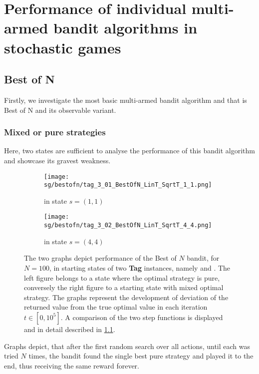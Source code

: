 \documentclass[../main.tex]{subfiles}
\begin{document}
\chapter{Performance of individual multi-armed bandit algorithms in stochastic games}\label{apx:sgexp}

\section{Best of N}\label{apx:sgexp:bestofn}
Firstly, we investigate the most basic multi-armed bandit algorithm and that is Best of N and its observable variant.

\subsection{Mixed or pure strategies}
Here, two states are sufficient to analyse the performance of this bandit algorithm and showcase its gravest weakness.

\begin{figure}[ht]
    \begin{subfigure}[t]{0.45\linewidth}
        \texttt{[image: sg/bestofn/tag\_3\_01\_BestOfN\_LinT\_SqrtT\_1\_1.png]}
        \caption{ in state $s = \left(1, 1\right)$}
        \label{apx:sgexp:bestofn:fig:pure}
    \end{subfigure}
    \hfill
    \begin{subfigure}[t]{0.45\linewidth}
        \texttt{[image: sg/bestofn/tag\_3\_02\_BestOfN\_LinT\_SqrtT\_4\_4.png]}
        \caption{ in state $s = \left(4, 4\right)$}
        \label{apx:sgexp:bestofn:fig:mixed}
    \end{subfigure}
    \caption[Performance of the Best of $N$ bandit on instances of \textbf{Tag}]{
        The two graphs depict performance of the Best of $N$ bandit, for $N = 100$, in starting states of two \textbf{Tag} instances, namely  and .
        The left figure belongs to a state where the optimal strategy is pure, conversely the right figure to a starting state with mixed optimal strategy.
        The graphs represent the development of deviation of the returned value from the true optimal value in each iteration $t \in [0, 10^5]$.
        A comparison of the two step functions is displayed and in detail described in \ref{apx:sgexp:bestofn}.
    }
    \label{apx:sgexp:bestofn:fig}
\end{figure}
Graphs  depict, that after the first random search over all actions, until each was tried $N$ times, the bandit found the single best pure strategy and played it to the end, thus receiving the same reward forever.
\end{document}
